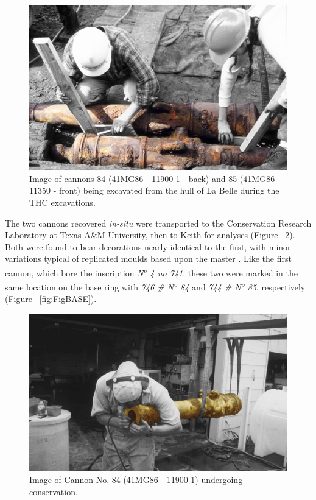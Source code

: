 \documentclass[review]{elsarticle}
\begin{document}
\begin{figure}[ht]\centering
\includegraphics[width=\linewidth]{FigExcavate2}
\caption{Image of cannons 84 (41MG86 - 11900-1 - back) and 85 (41MG86 - 11350 - front) being excavated from the hull of La Belle during the THC excavations.}
\label{fig:FigExcavate}
\end{figure}

The two cannons recovered \textit{in-situ} were transported to the Conservation Research Laboratory at Texas A\&M University, then to Keith for analyses (Figure ~\ref{fig:FigConserve}). Both were found to bear decorations nearly identical to the first, with minor variations typical of replicated moulds based upon the master \citep[361]{RN5763}. Like the first cannon, which bore the inscription \textit{N\textsuperscript{o} 4 no 741}, these two were marked in the same location on the base ring with \textit{746 \# N\textsuperscript{o} 84} and \textit{744 \# N\textsuperscript{o} 85}, respectively (Figure ~\ref{fig:FigBASE}).

\begin{figure}[ht]\centering
\includegraphics[width=\linewidth]{FigConserve2}
\caption{Image of Cannon No. 84 (41MG86 - 11900-1) undergoing conservation.}
\label{fig:FigConserve}
\end{figure}
\end{document}
